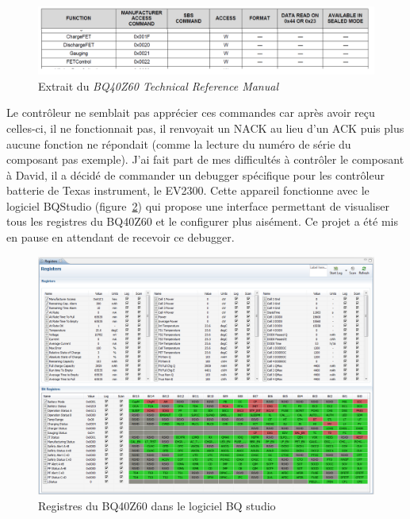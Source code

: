 \documentclass[a4paper, 11pt]{report}
\begin{document}
\begin{figure}[!h]
\begin{center}
\includegraphics[scale=0.85]{figures/screenshots/BQ40Z60_manual_excerpt.png}
\end{center}
\caption{Extrait du \emph{BQ40Z60 Technical Reference Manual}\cite{BQ40Z60_tech_manual}} 
\label{fig:BQ40Z60_manual_excerpt}
\end{figure}

Le contrôleur ne semblait pas apprécier ces commandes car après avoir reçu celles-ci, il ne fonctionnait pas, il renvoyait un NACK au lieu d’un ACK puis plus aucune fonction ne répondait (comme la lecture du numéro de série du composant pas exemple).
J’ai fait part de mes difficultés à contrôler le composant à David, il a décidé de commander un debugger spécifique pour les contrôleur batterie de Texas instrument, le EV2300. Cette appareil fonctionne avec le logiciel BQStudio (figure~\ref{fig:BQ40Z60_registers}) qui propose une interface permettant de visualiser tous les registres du BQ40Z60 et le configurer plus aisément. Ce projet a été mis en pause en attendant de recevoir ce debugger.

\begin{figure}[!h]
\begin{center}
\includegraphics[scale=0.4]{figures/screenshots/BQ40Z60_registers.png}
\end{center}
\caption{Registres du BQ40Z60 dans le logiciel BQ studio}
\label{fig:BQ40Z60_registers}
\end{figure}
\end{document}
